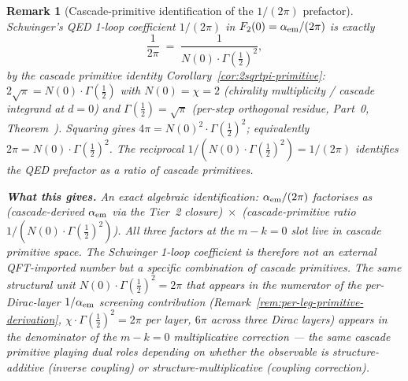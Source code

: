 \documentclass[12pt,a4paper]{article}
\newtheorem*{remark}{Remark}
\begin{document}
\begin{remark}[Cascade-primitive identification of the $1/(2\pi)$ prefactor]\label{rem:two-pi-prefactor-identification}
Schwinger's QED 1-loop coefficient $1/(2\pi)$ in $F_2(0) = \alpha_{\rm em}/(2\pi)$ is exactly
\[
\frac{1}{2\pi} \;=\; \frac{1}{N(0)\cdot\Gamma(\tfrac{1}{2})^2},
\]
by the cascade primitive identity Corollary~\ref{cor:2sqrtpi-primitive}: $2\sqrt{\pi} = N(0)\cdot\Gamma(\tfrac{1}{2})$ with $N(0) = \chi = 2$ (chirality multiplicity / cascade integrand at $d=0$) and $\Gamma(\tfrac{1}{2}) = \sqrt{\pi}$ (per-step orthogonal residue, Part~0, Theorem~). Squaring gives $4\pi = N(0)^2\cdot\Gamma(\tfrac{1}{2})^2$; equivalently $2\pi = N(0)\cdot\Gamma(\tfrac{1}{2})^2$. The reciprocal $1/(N(0)\cdot\Gamma(\tfrac{1}{2})^2) = 1/(2\pi)$ identifies the QED prefactor as a ratio of cascade primitives.

\medskip\noindent\textbf{What this gives.} An exact algebraic identification: $\alpha_{\rm em}/(2\pi)$ factorises as (cascade-derived $\alpha_{\rm em}$ via the Tier~2 closure)~$\times$~(cascade-primitive ratio $1/(N(0)\cdot\Gamma(\tfrac{1}{2})^2)$). All three factors at the $m-k=0$ slot live in cascade primitive space. The Schwinger 1-loop coefficient is therefore not an external QFT-imported number but a specific combination of cascade primitives. The same structural unit $N(0)\cdot\Gamma(\tfrac{1}{2})^2 = 2\pi$ that appears in the \emph{numerator} of the per-Dirac-layer $1/\alpha_{\rm em}$ screening contribution (Remark~\ref{rem:per-leg-primitive-derivation}, $\chi\cdot\Gamma(\tfrac{1}{2})^2=2\pi$ per layer, $6\pi$ across three Dirac layers) appears in the \emph{denominator} of the $m-k=0$ multiplicative correction --- the same cascade primitive playing dual roles depending on whether the observable is structure-additive (inverse coupling) or structure-multiplicative (coupling correction).


\end{remark}
\end{document}

